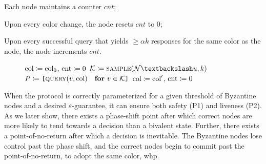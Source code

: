 \documentclass[letterpaper,twocolumn,10pt]{article}
\theoremstyle{definition}
\begin{document}
\begin{compactenum}
	\item Each node maintains a counter $\mathit{cnt}$;
    \item Upon every color change, the node resets $\mathit{cnt}$ to 0;
    \item Upon every successful query that yields $\ge \alpha k$ responses for the same color as the node, the node increments $\mathit{cnt}$.
\end{compactenum}

\begin{figure}
    \small
\begin{algorithmic}[1]
        \State $\textrm{col} \coloneqq \textrm{col}_0$, $\textrm{cnt} \coloneqq 0$
            \If{$\codecolor = \bot$}
                \Continue
            \EndIf
            \State $\mathcal{K} \coloneqq \Call{sample}{\mathcal{N}\textbackslash u, k}$
            \State $P \coloneqq \texttt{[}\Call{query}{v, \codecolor}\quad\textbf{for}\ v \in \mathcal{K}\texttt{]}$
                    \State $\textrm{col} \coloneqq \textrm{col}'$, $\textrm{cnt} \coloneqq 0$
                \Else
                    \IIf {$\texttt{++}\codecount > \beta$} 
                \EndIf
            \EndIf
            \EndFor
        \EndWhile
    \EndProcedure
    \label{fig:snowflake-loop}
\end{algorithmic}
\end{figure}

When the protocol is correctly parameterized for a given threshold of Byzantine nodes and a desired $\varepsilon$-guarantee, it can ensure both safety (P1) and liveness (P2).
As we later show, there exists a phase-shift point after which correct nodes are more likely to tend towards a decision than a bivalent state.
Further, there exists a point-of-no-return after which a decision is inevitable.
The Byzantine nodes lose control past the phase shift, and the correct nodes begin to commit past the point-of-no-return, to adopt the same color, whp.
\end{document}
